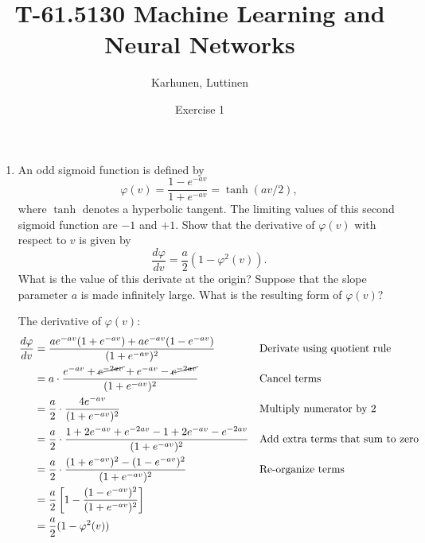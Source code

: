 
\title{T-61.5130 Machine Learning and Neural Networks}
\author{Karhunen, Luttinen}
\date{Exercise 1}

\newcommand{\vect}[1]{{\bf{#1}}}
\newcommand{\svect}[1]{\boldsymbol{#1}}
\newcommand{\matr}[1]{\boldsymbol{#1}}

\usepackage{cancel}
\usepackage{mathtools}



\maketitle

\begin{enumerate}

\item

  An odd sigmoid function is defined by
  \begin{equation}
    \label{eq:sigmoid}
    \varphi(v)=\frac{1-e^{-av}}{1+e^{-av}}=\tanh(av/2),
  \end{equation}
  where $\tanh$ denotes a hyperbolic tangent. The limiting values of
  this second sigmoid function are $-1$ and $+1$. Show that the
  derivative of $\varphi(v)$ with respect to $v$ is given by
  \begin{equation*}
    \frac{d\varphi}{dv}=\frac{a}{2}(1-\varphi^2(v)).
  \end{equation*}
  What is the value of this derivate at the origin? Suppose that the
  slope parameter $a$ is made infinitely large. What is the resulting
  form of $\varphi(v)$?  
  
  \begin{solution}

    The derivative of $\varphi(v)$:
    \begin{align*}
      \frac{d\varphi}{dv} &= \frac{a e^{-av} (1 + e^{-av}) + a
        e^{-av} (1 - e^{-av})} {(1+e^{-av})^2}
      && \text{Derivate using quotient rule}
      \\
      &= a \cdot \frac{ e^{-av} + \cancel{e^{-2av}} + e^{-av} -
        \cancel{e^{-2av}}} {(1 + e^{-av})^2}
      && \text{Cancel terms}
      \\
      &= \frac{a}{2} \cdot \frac{4 e^{-av}} {(1+e^{-av})^2} &&
      \text{Multiply numerator by 2}
      \\
      &= \frac{a}{2} \cdot \frac{1+2e^{-av}+e^{-2av} -
        1+2e^{-av}-e^{-2av}} {(1+e^{-av})^2} && \text{Add extra
        terms that sum to zero}
      \\
      &= \frac{a}{2} \cdot \frac{(1+e^{-av})^2 - (1-e^{-av})^2}
      {(1+e^{-av})^2} && \text{Re-organize terms}
      \\
      &= \frac{a}{2} \left[ 1 - \frac{(1-e^{-av})^2} {(1+e^{-av})^2}
      \right]
      \\
      &= \frac{a}{2} ( 1 - \varphi^2(v) )
    \end{align*}


\end{solution}
\end{enumerate}
